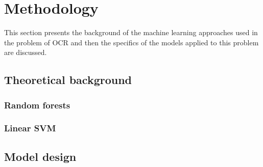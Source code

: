 \section{Methodology}
This section presents the background of the machine learning approaches used in the problem of OCR and then the specifics of the models applied to this problem are discussed. 
\subsection{Theoretical background}
\subsubsection{Random forests}
\subsubsection{Linear SVM}
\subsection{Model design}




